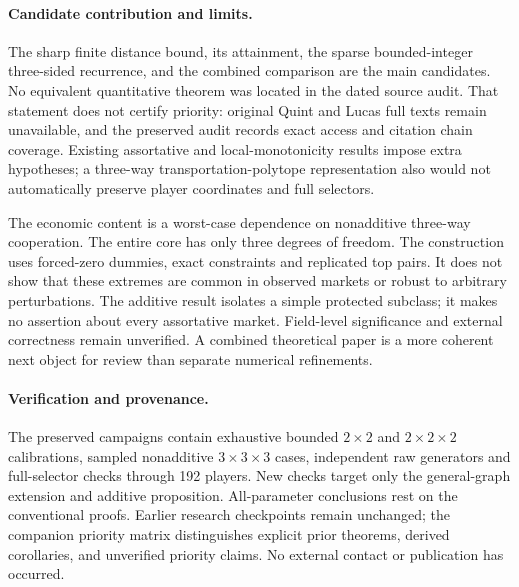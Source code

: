 \documentclass[11pt]{article}
\begin{document}
\paragraph{Candidate contribution and limits.}
The sharp finite distance bound, its attainment, the sparse bounded-integer
three-sided recurrence, and the combined comparison are the main candidates.
No equivalent quantitative theorem was located in the dated source audit.
That statement does not certify priority: original Quint and Lucas full texts
remain unavailable, and the preserved audit records exact access and citation
chain coverage. Existing assortative and local-monotonicity results impose
extra hypotheses; a three-way transportation-polytope representation also
would not automatically preserve player coordinates and full selectors.

The economic content is a worst-case dependence on nonadditive three-way
cooperation. The entire core has only three degrees of freedom.
The construction uses forced-zero dummies, exact constraints and
replicated top pairs. It does not show that these extremes are common in
observed markets or robust to arbitrary perturbations. The additive result
isolates a simple protected subclass; it makes no assertion about every
assortative market. Field-level significance and external correctness remain
unverified. A combined theoretical paper is a more coherent next object for
review than separate numerical refinements.

\paragraph{Verification and provenance.}
The preserved campaigns contain exhaustive bounded $2\times2$ and
$2\times2\times2$ calibrations, sampled nonadditive $3\times3\times3$ cases,
independent raw generators and full-selector checks through 192 players.
New checks target only the general-graph extension and additive proposition.
All-parameter conclusions rest on the conventional proofs. Earlier research
checkpoints remain unchanged; the companion priority matrix distinguishes
explicit prior theorems, derived corollaries, and unverified priority claims.
No external contact or publication has occurred.
\end{document}

